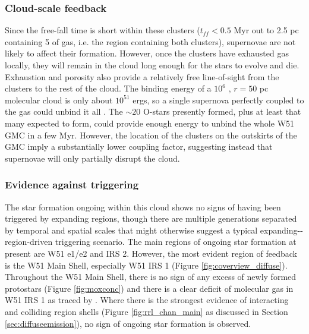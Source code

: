 \subsubsection{Cloud-scale feedback}
Since the free-fall time is short within these clusters ($t_{ff} < 0.5$ Myr out
to 2.5 pc containing 5 \msun of gas, i.e. the region containing both
clusters), supernovae are not likely
to affect their formation.  However, once the clusters have exhausted gas
locally, they
will remain in the cloud long enough for the stars to evolve and die.
Exhaustion and porosity also provide a relatively free line-of-sight from the
clusters to the rest
of the cloud.  The binding energy of a $10^6$ \msun, $r=50$ pc 
molecular cloud is only about $10^{51}$ ergs, so a single supernova perfectly
coupled to the gas could unbind it all \citep[though typical energy delivered
to molecular clouds is lower, $\sim0.01-0.25$; see references in][appendix
B]{Kruijssen2012a}.  The $\sim20$ O-stars presently formed,
plus at least that many expected to form, could provide enough energy
to unbind the whole W51 GMC in a few Myr.  However, the location of the clusters
on the outskirts of the GMC imply a substantially lower coupling factor,
suggesting instead that supernovae will only partially disrupt the cloud.

\subsubsection{Evidence against triggering}
The star formation ongoing within this cloud shows no signs of having been
triggered by expanding \hii regions, though there are multiple generations
separated by temporal and spatial scales that might otherwise suggest a typical
expanding-\hii-region-driven triggering
scenario.  The main regions of ongoing star formation at present are W51 e1/e2
and IRS 2.  However, the most evident region of feedback is the W51 Main Shell,
especially W51 IRS 1 
(Figure \ref{fig:coverview_diffuse}).  Throughout the W51 Main Shell, there is no sign
of any excess of newly formed protostars (Figure \ref{fig:moxconc}) and there
is a clear deficit of molecular gas in W51 IRS 1 as traced by \ceighteeno \citep[Figure
\ref{fig:contonco};][]{Parsons2012a}.  Where there is the
strongest evidence of interacting and colliding \hii region shells (Figure
\ref{fig:rrl_chan_main} as discussed in Section \ref{sec:diffuseemission}),
no sign of ongoing star formation is observed.


